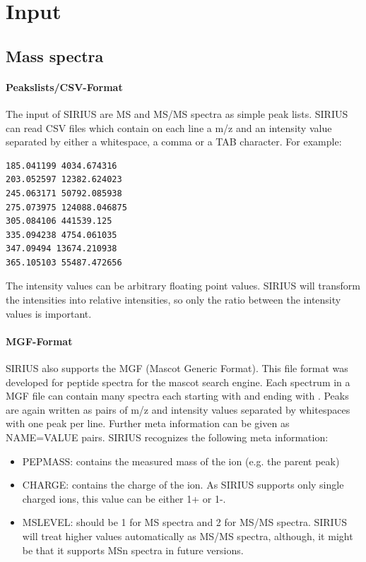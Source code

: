 \documentclass[letterpaper,10pt,openany,oneside]{sphinxmanual}
\begin{document}
\section{Input}
\label{commandline:inputformats}\label{commandline:supported-input-formats}

\subsection{Mass spectra}
\label{commandline:mass-spectra}
\paragraph{Peakslists/CSV-Format}
The input of SIRIUS are MS and MS/MS spectra as simple peak lists. SIRIUS can read CSV files which contain on each line a m/z and an intensity value separated by either a whitespace, a comma or a TAB character. For example:

\begin{Verbatim}[commandchars=\\\{\}]
185.041199 4034.674316
203.052597 12382.624023
245.063171 50792.085938
275.073975 124088.046875
305.084106 441539.125
335.094238 4754.061035
347.09494 13674.210938
365.105103 55487.472656
\end{Verbatim}

The intensity values can be arbitrary floating point values. SIRIUS will transform the intensities into relative intensities, so only the ratio between the intensity values is important.

\paragraph{MGF-Format}
SIRIUS also supports the MGF (Mascot Generic Format). This file format was developed for peptide spectra for the mascot search engine. Each spectrum in a MGF file can contain many spectra each starting with  and ending with . Peaks are again written as pairs of m/z and intensity values separated by whitespaces with one peak per line. Further meta information can be given as NAME=VALUE pairs. SIRIUS recognizes the following meta information:
\begin{itemize}
	\item {} 
	PEPMASS: contains the measured mass of the ion (e.g. the parent peak)
	
	\item {} 
	CHARGE: contains the charge of the ion. As SIRIUS supports only single charged ions, this value can be either 1+ or 1-.
	
	\item {} 
	MSLEVEL: should be 1 for MS spectra and 2 for MS/MS spectra. SIRIUS will treat higher values automatically as MS/MS spectra, although, it might be that it supports MSn spectra in future versions.
	
\end{itemize}
\end{document}
